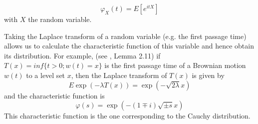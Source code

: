 \documentclass[12pt]{book}
\begin{document}
\begin{equation*}
\varphi _X(t)=E[e^{itX}]
\end{equation*}
with $X$ the random variable. 

Taking the Laplace transform of a random variable (e.g. the first passage time) allows us to calculate the characteristic function of this variable and hence obtain its distribution. 
For example, (see \cite{knight1981essentials}, Lemma 2.11) if $T(x)=inf\{t>0;w(t)=x\}$ is the first passage time of a Brownian motion $w(t)$ to a level set $x$, then the Laplace transform of $T(x)$ is given by 
\begin{equation*}
E\exp(-\lambda T(x))=\exp(-\sqrt{2\lambda}x)
\end{equation*}
and the characteristic function is 
\begin{equation*}
\varphi(s)=\exp(-(1\mp i)\sqrt{\pm s}x)
\end{equation*}
This characteristic function is the one corresponding to the Cauchy distribution. 



\end{document}
